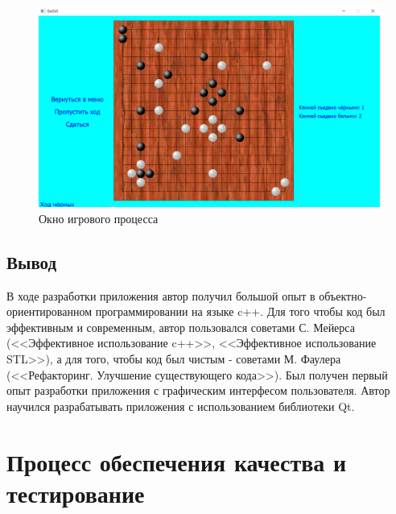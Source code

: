 \begin{figure}[H]
	\begin{center}
		\includegraphics[scale=0.5]{pics/GoGUI/Board.png}
	    \caption{Окно игрового процесса } 
		\label{pic:GUI_board}
	\end{center}
\end{figure}

\subsection*{Вывод}

В ходе разработки приложения автор получил большой опыт в объектно-ориентированном программировании на языке c++. Для того чтобы код был эффективным и современным, автор пользовался советами С. Мейерса (<<Эффективное использование c++>>, <<Эффективное использование STL>>), а для того, чтобы код был чистым - советами М. Фаулера (<<Рефакторинг. Улучшение существующего кода>>). Был получен первый опыт разработки приложения с графическим интерфесом пользователя. Автор научился разрабатывать приложения с использованием библиотеки Qt.

\section*{Процесс обеспечения качества и тестирование}


